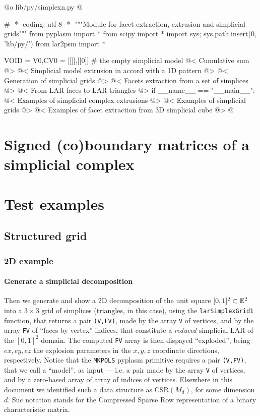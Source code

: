 \documentclass[11pt,oneside]{article}	%
\begin{document}
@o lib/py/simplexn.py 
@{# -*- coding: utf-8 -*-
"""Module for facet extraction, extrusion and simplicial grids"""
from pyplasm import *
from scipy import *
import sys; sys.path.insert(0, 'lib/py/')
from lar2psm import *

VOID = V0,CV0 = [[]],[[0]]    # the empty simplicial model
@< Cumulative sum  @>
@< Simplicial model extrusion in accord with a 1D pattern @>
@< Generation of simplicial grids @>
@< Facets extraction from a set of simplices @>
@< From LAR faces to LAR triangles @>
if __name__ == "__main__":
	@< Examples of simplicial complex extrusions @>
	@< Examples of simplicial grids @>
	@< Examples of facet extraction from 3D simplicial cube @>
@}


\section{Signed (co)boundary matrices of a simplicial complex}
\label{simplicial}

\section{Test examples}

\subsection{Structured grid}

\subsubsection{2D example}

\paragraph{Generate a simplicial decomposition}
Then we generate and show a 2D decomposition of the unit square $[0,1]^2\subset\mathbb{E}^2$ into a $3\times 3$ grid of simplices (triangles, in this case), using the \texttt{larSimplexGrid1} function, that returns a pair \texttt{(V,FV)}, made by the array \texttt{V} of vertices, and by the array \texttt{FV} of ``faces by vertex'' indices, that constitute a \emph{reduced} simplicial LAR of the $[0,1]^2$ domain. The computed \texttt{FV} array is then dispayed ``exploded'', being $ex,ey,ez$ the explosion parameters in the $x,y,z$ coordinate directions, respectively. Notice that the \texttt{MKPOLS} pyplasm primitive requires a pair \texttt{(V,FV)}, that we call a ``model'', as input --- i.e. a pair made by the array \texttt{V} of vertices, and by a zero-based array of array of indices of vertices. Elsewhere in this document we identified such a data structure as CSR$(M_d)$, for some dimension $d$. Suc notation stands for the Compressed Sparse Row representation of a binary characteristic matrix.
\end{document}
